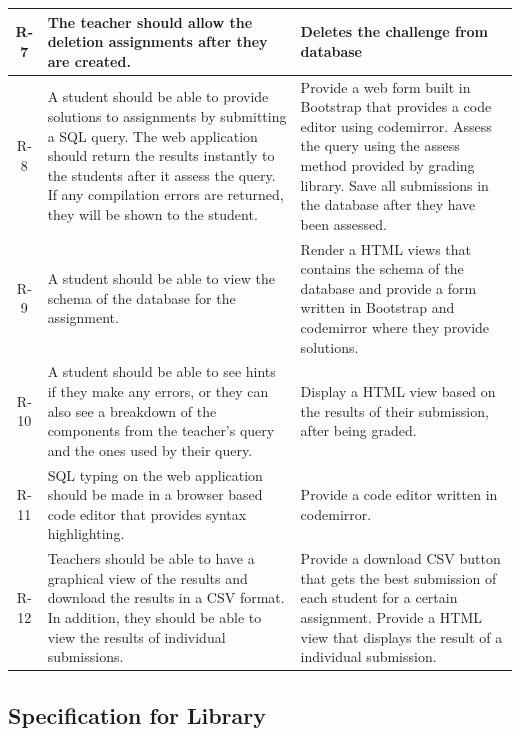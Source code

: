 \begin{tabularx}{\textwidth}{|c|Y|Y|}
  R-7 & The teacher should allow the deletion assignments after they are created. & Deletes the challenge from database \\\hline
  R-8 & A student should be able to provide solutions to assignments by submitting a SQL query. The web application should return the results instantly to the students after it assess the query. If any compilation errors are returned, they will be shown to the student. & Provide a web form built in Bootstrap that provides a code editor using codemirror. Assess the query using the assess method provided by grading library. Save all submissions in the database after they have been assessed. \\\hline
  R-9 & A student should be able to view the schema of the database for the assignment. & Render a HTML views that contains the schema of the database and provide a form written in Bootstrap and codemirror where they provide solutions. \\\hline
  R-10 & A  student  should  be  able  to  see  hints  if  they  make  any  errors,  or  they  can  also  see  a breakdown of the components from the teacher’s query and the ones used by their query. & Display a HTML view based on the results of their submission, after being graded. \\\hline
  R-11 & SQL typing on the web application should be made in a browser based code editor that provides syntax highlighting. & Provide a code editor written in codemirror. \\\hline
  R-12 & Teachers should be able to have a graphical view of the results and download the results in  a CSV format.   In  addition,  they  should  be  able  to  view  the  results  of  individual submissions. & Provide a download CSV button that gets the best submission of each student for a certain assignment. Provide a HTML view that displays the result of a individual submission. \\\hline
\end{tabularx}

\subsection{Specification for Library}

